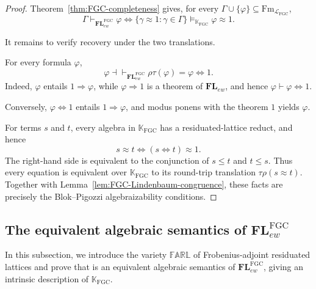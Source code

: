 \documentclass[final,12pt,times]{elsarticle}
\theoremstyle{plain}
\theoremstyle{definition}
\theoremstyle{break}
\newcommand{\FARL}{\mathbb{FARL}}
\begin{document}
\begin{proof}
Theorem~\ref{thm:FGC-completeness} gives, for every
$\Gamma\cup\{\varphi\}\subseteq
\mathrm{Fm}_{\mathcal L_{\mathrm{FGC}}}$,
\[
 \Gamma\vdash_{\mathbf{FL}^{\mathrm{FGC}}_{ew}}\varphi
 \Longleftrightarrow
 \{\gamma\approx1:\gamma\in\Gamma\}
 \models_{\mathbb K_{\mathrm{FGC}}}\varphi\approx1.
\]

It remains to verify recovery under the two translations.

For every formula $\varphi$,
\begin{equation}
 \varphi
 \dashv\vdash_{\mathbf{FL}^{\mathrm{FGC}}_{ew}}
 \rho\tau(\varphi)
 =\varphi\Leftrightarrow1.
 \label{eq:formula-recovery}
\end{equation}
Indeed, $\varphi$ entails $1\Rightarrow\varphi$, while
$\varphi\Rightarrow1$ is a theorem of $\mathbf{FL}_{ew}$, and hence
$\varphi\vdash\varphi\Leftrightarrow 1$.  

Conversely,
$\varphi\Leftrightarrow1$ entails $1\Rightarrow\varphi$, and modus ponens with the
theorem $1$ yields $\varphi$.

For terms $s$ and $t$, every algebra in
$\mathbb K_{\mathrm{FGC}}$ has a residuated-lattice reduct, and hence
\begin{equation}
 s\approx t
 \Longleftrightarrow
 (s\Leftrightarrow t)\approx1.
 \label{eq:equation-recovery}
\end{equation}
The right-hand side is equivalent to the conjunction of $s\le t$ and
$t\le s$.  Thus every equation is equivalent over
$\mathbb K_{\mathrm{FGC}}$ to its round-trip translation
$\tau\rho(s\approx t)$.  Together with
Lemma~\ref{lem:FGC-Lindenbaum-congruence}, these facts are precisely the
Blok--Pigozzi algebraizability conditions.
\end{proof}

\subsection{The equivalent algebraic semantics of
$\mathbf{FL}^{\mathrm{FGC}}_{ew}$}
\label{subsection:FARL-semantics}

In this subsection, we introduce the variety $\FARL$ of Frobenius-adjoint residuated lattices and prove that is an equivalent algebraic semantics of $\mathbf{FL}^{\mathrm{FGC}}_{ew}$, giving an intrinsic description of $\mathbb K_{\mathrm{FGC}}$.  
\end{document}
